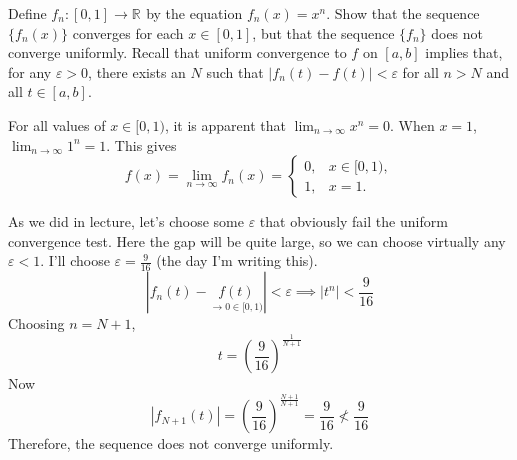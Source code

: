 \documentclass[11pt]{article}
\providecommand{\ra}{\rightarrow}
\providecommand{\R}[1][]{\ensuremath{\mathbb{R}^{#1}}}
\begin{document}
\begin{homeworkProblem}
    Define $f_n : [0, 1] \ra \R$ by the equation $f_n(x) = x^n$. Show that the sequence $\{f_n(x)\}$ converges for each $x \in [0, 1]$,
    but that the sequence $\{f_n\}$ does not converge uniformly. Recall that uniform convergence to $f$ on $[a, b]$ implies that,
    for any $\varepsilon > 0$, there exists an $N$ such that $|f_n(t) - f(t)| < \varepsilon$ for all $n > N$ and all $t \in [a, b]$. \\

    \solution

    For all values of $x \in [0, 1)$, it is apparent that $\lim_{n \to \infty} x^n = 0$. When $x = 1$, $\lim_{n \to \infty} 1^n = 1$. This gives
    \[
        f(x) = \lim_{n \to \infty} f_n(x) =
        \begin{cases}
            0, & x \in [0, 1), \\
            1, & x = 1.
        \end{cases}
    \]

    As we did in lecture, let's choose some $\varepsilon$ that obviously fail the uniform convergence test. Here the gap will be quite large, so we can
    choose virtually any $\varepsilon < 1$. I'll choose $\varepsilon = \frac{9}{16}$ (the day I'm writing this).
    \[
        |f_n(t) - \underset{\rightarrow 0 \in [0, 1)}{f(t)}| < \varepsilon \implies |t^n| < \frac{9}{16}
    \]
    Choosing $n = N + 1$,
    \[
        t = \left(\frac{9}{16}\right)^{\frac{1}{N+1}}
    \]
    Now
    \[
        |f_{N+1}(t)| = \left(\frac{9}{16}\right)^{\frac{N+1}{N+1}} = \frac{9}{16} \not< \frac{9}{16}
    \]
    Therefore, the sequence does not converge uniformly.

\end{homeworkProblem}
\end{document}
